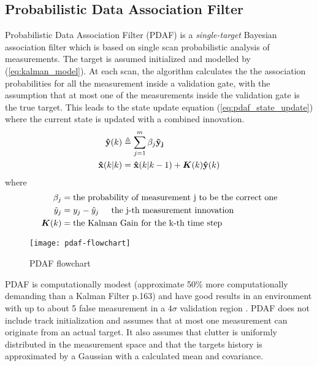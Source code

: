 \subsection{Probabilistic Data Association Filter}
\label{pdaf}
Probabilistic Data Association Filter (PDAF) is a \emph{single-target} Bayesian association filter which is based on single scan probabilistic analysis of measurements. The target is assumed initialized and modelled by (\ref{eq:kalman_model}). At each scan, the algorithm calculates the the association probabilities for all the measurement inside a validation gate, with the assumption that at most one of the measurements inside the validation gate is the true target. This leads to the state update equation (\ref{eq:pdaf_state_update}) where the current state is updated with a combined innovation.
\begin{equation}
\begin{split}
\boldsymbol{\mathbf{\hat{y}}}(k) &\triangleq \sum\limits_{j=1}^m \beta_j \boldsymbol{\mathbf{ \tilde{y}_j }} \\
\boldsymbol{\mathbf{\hat{x}}}(k|k) &= \boldsymbol{\mathbf{\hat{x}}}(k|k-1) + \bm{K}(k) \boldsymbol{\mathbf{\hat{y}}}(k)
\end{split}
\label{eq:pdaf_state_update}
\end{equation} 
where
\begin{equation*}
\begin{split}
	\beta_j		&= \text{the probability of measurement j to be the correct one} \\
	\tilde{y}_j &= y_j - \hat{y}_j \hspace{5mm}	\text{the j-th measurement innovation} \\
	\bm{K}(k) 	&= \text{the Kalman Gain for the k-th time step}
\end{split}
\end{equation*}
\begin{wrapfigure}[20]{R}{0.5\textwidth}
\centering
\texttt{[image: pdaf-flowchart]}
\caption{PDAF flowchart}
\label{fig:pdaf_flowchart}
\end{wrapfigure}
PDAF is computationally modest (approximate 50\% more computationally demanding than a Kalman Filter \cite{Bar-Shalom1998} p.163) and have good results in an environment with up to about 5 false measurement in a $4\sigma$ validation region \cite{Bar-Shalom1998}. PDAF does not include track initialization and assumes that at most one measurement can originate from an actual target. It also assumes that clutter is uniformly distributed in the measurement space and that the targets history is approximated by a Gaussian with a calculated mean and covariance.

